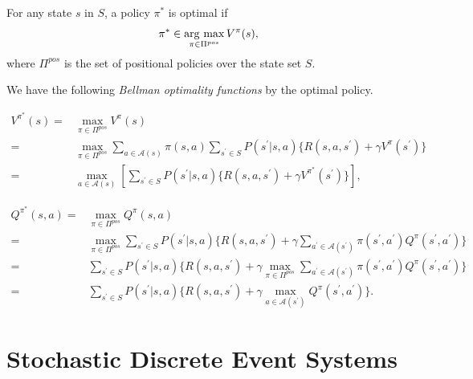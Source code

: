 \documentclass[a4j,12pt,oneside,openany,english]{jsbook}
\newcommand{\argmax}{\mathop{\rm arg~max}\limits}
\begin{document}
\begin{definition}
  For any state $s$ in $S$, a policy $\pi^{\ast}$ is optimal if
  \begin{align*}
    \pi^{\ast} \in \argmax_{\pi \in \Pi^{pos}} V^{\pi}(s),
  \end{align*}
where $\Pi^{pos}$ is the set of positional policies over the state set $S$.

We have the following {\it Bellman optimality functions} by the optimal policy.

\begin{align*}
  V^{\pi^{\ast}}(s) = & \max_{\pi \in \Pi^{pos}} V^{\pi}(s) \\
                    = & \max_{\pi \in \Pi^{pos}} \sum_{a \in \mathcal{A}(s)} \pi(s,a) \sum_{s^{\prime} \in S} P(s^{\prime}|s,a) \{ R(s, a, s^{\prime}) + \gamma V^{\pi}(s^{\prime}) \} \\
                    = & \max_{a \in \mathcal{A}(s)} [ \sum_{s^{\prime} \in S} P(s^{\prime}|s,a) \{ R(s, a, s^{\prime}) + \gamma V^{\pi^{\ast}}(s^{\prime}) \} ],
\end{align*}

\begin{align*}
  Q^{\pi^{\ast}}(s,a) = & \max_{\pi \in \Pi^{pos}} Q^{\pi}(s,a) \\
                      = & \max_{\pi \in \Pi^{pos}} \sum_{s^{\prime} \in S} P(s^{\prime}|s,a) \{ R(s, a, s^{\prime}) + \gamma \sum_{a^{\prime} \in \mathcal{A}(s^{\prime})} \pi(s^{\prime}, a^{\prime}) Q^{\pi}(s^{\prime},a^{\prime}) \} \\
                      = & \sum_{s^{\prime} \in S} P(s^{\prime}|s,a) \{ R(s, a, s^{\prime}) + \gamma \max_{\pi \in \Pi^{pos}} \sum_{a^{\prime} \in \mathcal{A}(s^{\prime})} \pi(s^{\prime}, a^{\prime}) Q^{\pi}(s^{\prime},a^{\prime}) \} \\
                      = & \sum_{s^{\prime} \in S} P(s^{\prime}|s,a) \{ R(s, a, s^{\prime}) + \gamma \max_{a \in \mathcal{A}(s^{\prime})} Q^{\pi}(s^{\prime},a^{\prime}) \}.
\end{align*}

\end{definition}

\section{Stochastic Discrete Event Systems}
\end{document}
